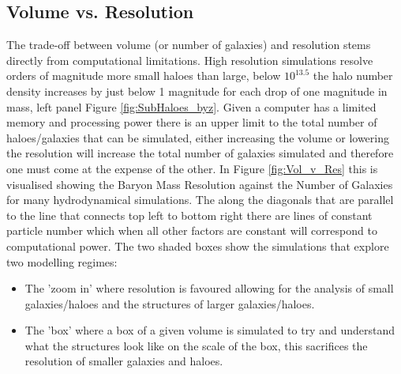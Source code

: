 \subsection{Volume vs. Resolution}
The trade-off between volume (or number of galaxies) and resolution stems directly from computational limitations. High resolution simulations resolve orders of magnitude more small haloes than large, below $10^13.5$ the halo number density increases by just below 1 magnitude for each drop of one magnitude in mass, left panel Figure \ref{fig:SubHaloes_byz}. Given a computer has a limited memory and processing power there is an upper limit to the total number of haloes/galaxies that can be simulated, either increasing the volume or lowering the resolution will increase the total number of galaxies simulated and therefore one must come at the expense of the other. In Figure \ref{fig:Vol_v_Res} this is visualised showing the Baryon Mass Resolution against the Number of Galaxies for many hydrodynamical simulations. The along the diagonals that are parallel to the line that connects top left to bottom right there are lines of constant particle number which when all other factors are constant will correspond to computational power. The two shaded boxes show the simulations that explore two modelling regimes:
\begin{itemize}
    \item The 'zoom in' where resolution is favoured allowing for the analysis of small galaxies/haloes and the structures of larger galaxies/haloes.
    \item The 'box' where a box of a given volume is simulated to try and understand what the structures look like on the scale of the box, this sacrifices the resolution of smaller galaxies and haloes.
\end{itemize}

